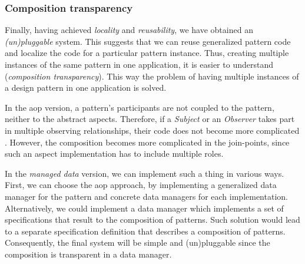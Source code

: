 \subsubsection{Composition transparency}
Finally, having achieved \textit{locality} and \textit{reusability}, we have obtained an \textit{(un)pluggable} system.
This suggests that we can reuse generalized pattern code and localize the code for a particular pattern instance.
Thus, creating multiple instances of the same pattern in one application, it is easier to understand (\textit{composition transparency}).
This way the problem of having multiple instances of a design pattern in one application is solved.

In the \ac{aop} version, a pattern's participants are not coupled to the pattern, neither to the abstract aspects.
Therefore, if a \textit{Subject} or an \textit{Observer} takes part in multiple observing relationships, their code does not become more complicated \cite{hannemann2005role}.
However, the composition becomes more complicated in the join-points, since such an aspect implementation has to include multiple roles.

In the \textit{managed data} version, we can implement such a thing in various ways.
First, we can choose the \ac{aop} approach, by implementing a generalized data manager for the pattern and concrete data managers for each implementation.
Alternatively, we could implement a data manager which implements a set of specifications that result to the composition of patterns.
Such solution would lead to a separate specification definition that describes a composition of patterns.
Consequently, the final system will be simple and (un)pluggable since the composition is transparent in a data manager.


